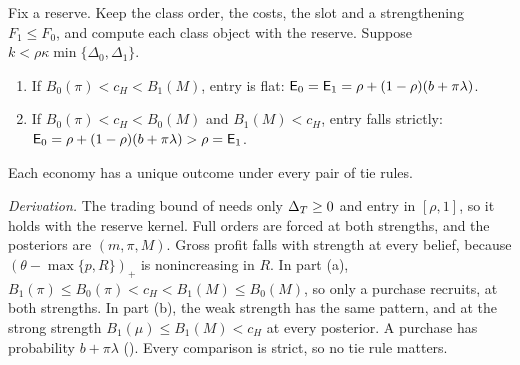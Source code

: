 \begin{resultbox}
Fix a reserve. Keep the class order, the costs, the slot and a strengthening \(F_1\le F_0\), and compute each class
object with the reserve. Suppose \(k<\rho\kappa\min\{\Delta_0,\Delta_1\}\).
\begin{enumerate}[label=(\alph*),leftmargin=2em]
\item If \(B_0(\pi)<c_H<B_1(M)\), entry is flat: \(\mathsf{E}_0=\mathsf{E}_1=\rho+(1-\rho)(b+\pi\lambda)\).
\item If \(B_0(\pi)<c_H<B_0(M)\) and \(B_1(M)<c_H\), entry falls strictly:
\(\mathsf{E}_0=\rho+(1-\rho)(b+\pi\lambda)>\rho=\mathsf{E}_1\).
\end{enumerate}
Each economy has a unique outcome under every pair of tie rules.
\end{resultbox}

\emph{Derivation.} The trading bound of  needs only \(\Delta_T\ge0\) and entry in \([\rho,1]\),
so it holds with the reserve kernel. Full orders are forced at both strengths, and the posteriors are \((m,\pi,M)\).
Gross profit falls with strength at every belief, because \((\theta-\max\{p,R\})_+\) is nonincreasing in \(R\). In
part (a), \(B_1(\pi)\le B_0(\pi)<c_H<B_1(M)\le B_0(M)\), so only a purchase recruits, at both strengths. In part (b),
the weak strength has the same pattern, and at the strong strength \(B_1(\mu)\le B_1(M)<c_H\) at every posterior. A
purchase has probability \(b+\pi\lambda\) (). Every comparison is strict, so no tie rule
matters.

